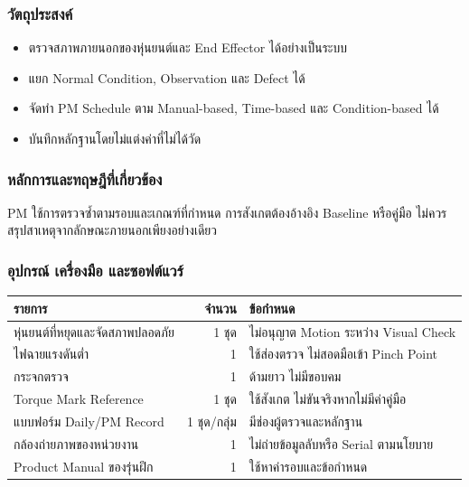 \subsubsection{วัตถุประสงค์}

\begin{itemize}
    \item ตรวจสภาพภายนอกของหุ่นยนต์และ End Effector ได้อย่างเป็นระบบ
    \item แยก Normal Condition, Observation และ Defect ได้
    \item จัดทำ PM Schedule ตาม Manual-based, Time-based และ Condition-based ได้
    \item บันทึกหลักฐานโดยไม่แต่งค่าที่ไม่ได้วัด
\end{itemize}

\subsubsection{หลักการและทฤษฎีที่เกี่ยวข้อง}

PM ใช้การตรวจซ้ำตามรอบและเกณฑ์ที่กำหนด การสังเกตต้องอ้างอิง Baseline หรือคู่มือ ไม่ควรสรุปสาเหตุจากลักษณะภายนอกเพียงอย่างเดียว

\subsubsection{อุปกรณ์ เครื่องมือ และซอฟต์แวร์}

\begin{table}[htbp]
    \centering
    \begin{tabular}{l r l}
        \hline
        \textbf{รายการ} & \textbf{จำนวน} & \textbf{ข้อกำหนด} \\
        \hline
        หุ่นยนต์ที่หยุดและจัดสภาพปลอดภัย & 1 ชุด & ไม่อนุญาต Motion ระหว่าง Visual Check \\
        ไฟฉายแรงดันต่ำ & 1 & ใช้ส่องตรวจ ไม่สอดมือเข้า Pinch Point \\
        กระจกตรวจ & 1 & ด้ามยาว ไม่มีขอบคม \\
        Torque Mark Reference & 1 ชุด & ใช้สังเกต ไม่ขันจริงหากไม่มีค่าคู่มือ \\
        แบบฟอร์ม Daily/PM Record & 1 ชุด/กลุ่ม & มีช่องผู้ตรวจและหลักฐาน \\
        กล้องถ่ายภาพของหน่วยงาน & 1 & ไม่ถ่ายข้อมูลลับหรือ Serial ตามนโยบาย \\
        Product Manual ของรุ่นฝึก & 1 & ใช้หาค่ารอบและข้อกำหนด \\
        \hline
    \end{tabular}
\end{table}


